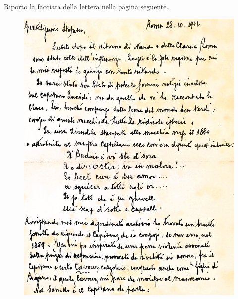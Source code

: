 \documentclass[10pt]{memoir} %
\begin{document}
\noindent Riporto la facciata della lettera nella pagina seguente.\\
 \begin{figure}[htb]
    \centering
    \includegraphics[width=\textwidth]{lettera}
\end{figure}

\end{document}
